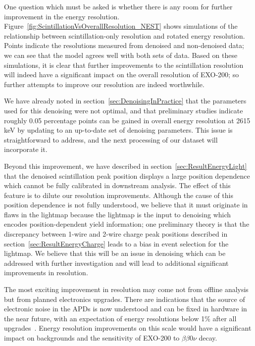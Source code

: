 One question which must be asked is whether there is any room for further improvement in the energy resolution.  Figure~\ref{fig:ScintillationVsOverallResolution_NEST} shows simulations of the relationship between scintillation-only resolution and rotated energy resolution.  Points indicate the resolutions measured from denoised and non-denoised data; we can see that the model agrees well with both sets of data.  Based on these simulations, it is clear that further improvements to the scintillation resolution will indeed have a significant impact on the overall resolution of EXO-200; so further attempts to improve our resolution are indeed worthwhile.

We have already noted in section~\ref{sec:DenoisingInPractice} that the parameters used for this denoising were not optimal, and that preliminary studies indicate roughly 0.05 percentage points can be gained in overall energy resolution at 2615 keV by updating to an up-to-date set of denoising parameters.  This issue is straightforward to address, and the next processing of our dataset will incorporate it.

Beyond this improvement, we have described in section~\ref{sec:ResultEnergyLight} that the denoised scintillation peak position displays a large position dependence which cannot be fully calibrated in downstream analysis.  The effect of this feature is to dilute our resolution improvements.  Although the cause of this position dependence is not fully understood, we believe that it must originate in flaws in the lightmap because the lightmap is the input to denoising which encodes position-dependent yield information; one preliminary theory is that the discrepancy between 1-wire and 2-wire charge peak positions described in section~\ref{sec:ResultEnergyCharge} leads to a bias in event selection for the lightmap.  We believe that this will be an issue in denoising which can be addressed with further investigation and will lead to additional significant improvements in resolution.

The most exciting improvement in resolution may come not from offline analysis but from planned electronics upgrades.  There are indications that the source of electronic noise in the APDs is now understood and can be fixed in hardware in the near future, with an expectation of energy resolutions below 1\% after all upgrades~\cite{ElectronicsUpgradeReport_March2014}.  Energy resolution improvements on this scale would have a significant impact on backgrounds and the sensitivity of EXO-200 to $\beta\beta 0\nu$ decay.

